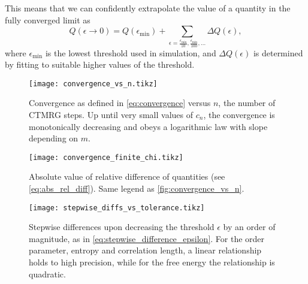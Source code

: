 
This means that we can confidently extrapolate the value of a quantity in the fully converged limit as
\begin{equation}\label{eq:extrapolation_fully_converged_limit_finite_m}
  Q(\epsilon \to 0) = Q(\epsilon_{\text{min}}) + \sum_{\epsilon = \frac{\epsilon_{\text{min}}}{10},
  \frac{\epsilon_{\text{min}}}{100}, \dots} \Delta Q(\epsilon),
\end{equation}
where $\epsilon_{\text{min}}$ is the lowest threshold used in simulation, and $\Delta Q(\epsilon)$ is determined
by fitting to suitable higher values of the threshold.

\begin{figure}
  \texttt{[image: convergence\_vs\_n.tikz]}
  \caption{Convergence as defined in \autoref{eq:convergence} versus $n$, the number of CTMRG
  steps.
  Up until very small values of $c_n$, the convergence is monotonically decreasing and obeys
  a logarithmic law with slope depending on $m$.}\label{fig:convergence_vs_n}
\end{figure}

\begin{figure}
  \texttt{[image: convergence\_finite\_chi.tikz]}
  \caption{Absolute value of relative difference of quantities (see \autoref{eq:abs_rel_diff}).
  Same legend as \autoref{fig:convergence_vs_n}.}\label{fig:convergence_finite_chi}
\end{figure}


\begin{figure}
  \texttt{[image: stepwise\_diffs\_vs\_tolerance.tikz]}
  \caption{Stepwise differences upon decreasing the threshold $\epsilon$ by an order of magnitude,
  as in \autoref{eq:stepwise_difference_epsilon}.
  For the order parameter, entropy and correlation length, a linear relationship holds to high precision,
  while for the free energy the relationship is quadratic.}\label{fig:stepwise_diffs_vs_tolerance}
\end{figure}




